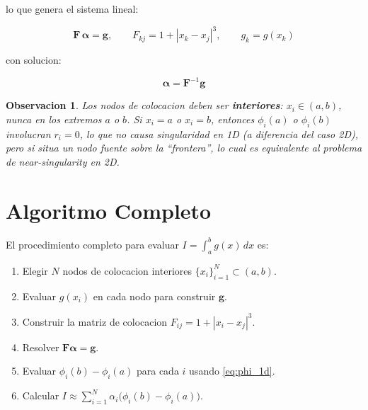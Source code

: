 \documentclass[12pt,a4paper]{article}
\newtheorem{remark}{Observacion}
\begin{document}
lo que genera el sistema lineal:

\begin{equation}
    \mathbf{F}\,\boldsymbol{\alpha} = \mathbf{g},
    \qquad F_{kj} = 1 + |x_k - x_j|^3,
    \qquad g_k = g(x_k)
\end{equation}

con solucion:

\begin{equation}
    \boldsymbol{\alpha} = \mathbf{F}^{-1}\mathbf{g}
\end{equation}

\begin{remark}
Los nodos de colocacion deben ser \textbf{interiores}: $x_i \in (a,b)$,
nunca en los extremos $a$ o $b$. Si $x_i = a$ o $x_i = b$, entonces
$\phi_i(a)$ o $\phi_i(b)$ involucran $r_i = 0$, lo que no causa singularidad
en 1D (a diferencia del caso 2D), pero si situa un nodo fuente sobre la
``frontera'', lo cual es equivalente al problema de near-singularity en 2D.
\end{remark}

\section{Algoritmo Completo}

El procedimiento completo para evaluar $I = \int_a^b g(x)\,dx$ es:

\begin{enumerate}
    \item Elegir $N$ nodos de colocacion interiores
    $\{x_i\}_{i=1}^N \subset (a,b)$.

    \item Evaluar $g(x_i)$ en cada nodo para construir $\mathbf{g}$.

    \item Construir la matriz de colocacion $F_{ij} = 1 + |x_i - x_j|^3$.

    \item Resolver $\mathbf{F}\boldsymbol{\alpha} = \mathbf{g}$.

    \item Evaluar $\phi_i(b) - \phi_i(a)$ para cada $i$ usando
    \eqref{eq:phi_1d}.

    \item Calcular $I \approx \sum_{i=1}^N \alpha_i\bigl(\phi_i(b)
    - \phi_i(a)\bigr)$.
\end{enumerate}
\end{document}
